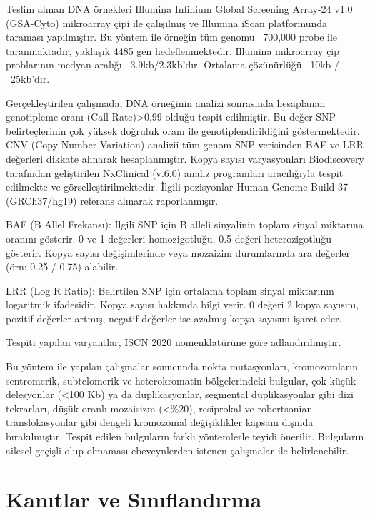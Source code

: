 \documentclass{article}
\begin{document}
Teslim alınan DNA örnekleri Illumina Infinium Global Screening Array-24 v1.0 (GSA-Cyto) mikroarray çipi ile çalışılmış ve Illumina iScan platformunda taraması yapılmıştır. Bu yöntem ile örneğin tüm genomu ~700,000 probe ile taranmaktadır, yaklaşık 4485 gen hedeflenmektedir. Illumina mikroarray çip problarının medyan aralığı ~3.9kb/2.3kb’dır. Ortalama çözünürlüğü ~10kb / ~25kb’dır.

Gerçekleştirilen çalışmada, DNA örneğinin analizi sonrasında hesaplanan genotipleme oranı (Call Rate)>0.99 olduğu tespit edilmiştir. Bu değer SNP belirteçlerinin çok yüksek doğruluk oranı ile genotiplendirildiğini göstermektedir. CNV (Copy Number Variation) analizii tüm genom SNP verisinden BAF ve LRR değerleri dikkate alınarak hesaplanmıştır. Kopya sayısı varyasyonları Biodiscovery tarafından geliştirilen NxClinical (v.6.0) analiz programları aracılığıyla tespit edilmekte ve görselleştirilmektedir. İlgili pozisyonlar Human Genome Build 37 (GRCh37/hg19) referans alınarak raporlanmışır.

BAF (B Allel Frekansı): İlgili SNP için B alleli sinyalinin toplam sinyal miktarına oranını gösterir. 0 ve 1 değerleri homozigotluğu, 0.5 değeri heterozigotluğu gösterir. Kopya sayısı değişimlerinde veya mozaizim durumlarında ara değerler (örn: 0.25 / 0.75) alabilir. 

LRR (Log R Ratio): Belirtilen SNP için ortalama toplam sinyal miktarının logaritmik ifadesidir. Kopya sayısı hakkında bilgi verir. 0 değeri 2 kopya sayısını, pozitif değerler artmış, negatif  değerler  ise  azalmış  kopya sayısını işaret eder.

Tespiti yapılan varyantlar, ISCN 2020 nomenklatürüne göre adlandırılmıştır.

Bu yöntem ile yapılan çalışmalar sonucunda nokta mutasyonları, kromozomların sentromerik, subtelomerik ve heterokromatin bölgelerindeki bulgular, çok küçük delesyonlar (<100 Kb) ya da duplikasyonlar, segmental duplikasyonlar gibi dizi tekrarları, düşük oranlı mozaisizm (<\%20), resiprokal ve robertsonian translokasyonlar gibi dengeli kromozomal değişiklikler kapsam dışında bırakılmıştır. Tespit edilen bulguların farklı yöntemlerle teyidi önerilir. Bulguların ailesel geçişli olup olmaması ebeveynlerden istenen çalışmalar ile belirlenebilir.

\section{Kanıtlar ve Sınıflandırma}
\end{document}
